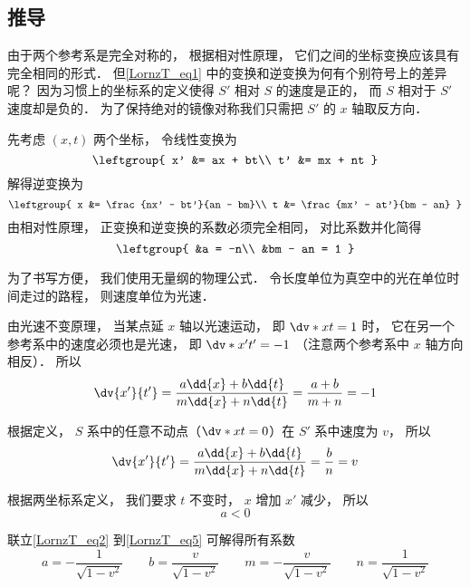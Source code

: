 \subsection{推导}
由于两个参考系是完全对称的， 根据相对性原理， 它们之间的坐标变换应该具有完全相同的形式． 但\autoref{LornzT_eq1} 中的变换和逆变换为何有个别符号上的差异呢？ 因为习惯上的坐标系的定义使得 $S'$ 相对 $S$ 的速度是正的， 而 $S$ 相对于 $S'$ 速度却是负的． 为了保持绝对的镜像对称我们只需把 $S'$ 的 $x$ 轴取反方向．

先考虑 $(x, t)$ 两个坐标， 令线性变换为
\begin{equation}
\leftgroup{
x' &= ax + bt\\
t' &= mx + nt
}
\end{equation}
解得逆变换为
\begin{equation}
\leftgroup{
x &= \frac{nx' - bt'}{an - bm}\\
t &= \frac{mx' - at'}{bm - an}
}
\end{equation}
由相对性原理， 正变换和逆变换的系数必须完全相同， 对比系数并化简得
\begin{equation}\label{LornzT_eq2}
\leftgroup{
&a = -n\\
&bm - an = 1
}
\end{equation}

为了书写方便， 我们使用无量纲的物理公式． 令长度单位为真空中的光在单位时间走过的路程， 则速度单位为光速．

由光速不变原理， 当某点延 $x$ 轴以光速运动， 即 $\dv*{x}{t} = 1$ 时， 它在另一个参考系中的速度必须也是光速， 即 $\dv*{x'}{t'} = -1$ （注意两个参考系中 $x$ 轴方向相反）． 所以
\begin{equation}\label{LornzT_eq3}
\dv{x'}{t'} = \frac{a\dd{x} + b\dd{t}}{m\dd{x} + n\dd{t}} = \frac{a + b}{m + n} = -1
\end{equation}

根据定义， $S$ 系中的任意不动点（$\dv*{x}{t} = 0$）在 $S'$ 系中速度为 $v$， 所以
\begin{equation}\label{LornzT_eq4}
\dv{x'}{t'} = \frac{a\dd{x} + b\dd{t}}{m\dd{x} + n\dd{t}} = \frac{b}{n} = v
\end{equation}

根据两坐标系定义， 我们要求 $t$ 不变时， $x$ 增加 $x'$ 减少， 所以
\begin{equation}\label{LornzT_eq5}
a < 0
\end{equation}

联立\autoref{LornzT_eq2} 到\autoref{LornzT_eq5} 可解得所有系数
\begin{equation}
a = - \frac{1}{\sqrt{1-v^2}} \qquad
b = \frac{v}{\sqrt{1-v^2}} \qquad
m = - \frac{v}{\sqrt{1-v^2}} \qquad
n = \frac{1}{\sqrt{1-v^2}}
\end{equation}

